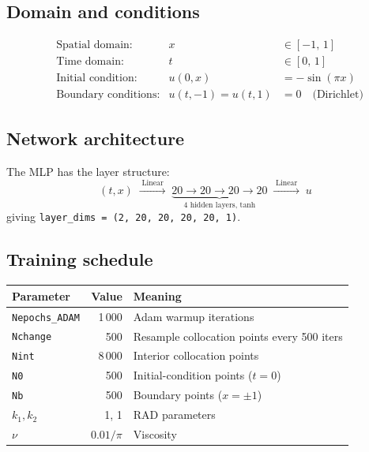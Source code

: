 \documentclass[11pt,a4paper]{article}
\begin{document}
\subsection*{Domain and conditions}

\begin{align}
  &\text{Spatial domain:}  &x &\in [-1,\, 1] \\
  &\text{Time domain:}     &t &\in [0,\, 1]   \\
  &\text{Initial condition:} &u(0, x) &= -\sin(\pi x) \label{eq:ic}\\
  &\text{Boundary conditions:} &u(t, -1) = u(t, 1) &= 0 \quad\text{(Dirichlet)} \label{eq:bc}
\end{align}

\subsection*{Network architecture}

The MLP has the layer structure:
\[
  (t,x) \;\xrightarrow{\;\text{Linear}\;}\;
  \underbrace{20 \to 20 \to 20 \to 20}_{\text{4 hidden layers, tanh}}
  \;\xrightarrow{\;\text{Linear}\;}\; u
\]
giving \texttt{layer\_dims = (2, 20, 20, 20, 20, 1)}.

\subsection*{Training schedule}

\begin{center}
\begin{tabular}{lrl}
\toprule
\textbf{Parameter} & \textbf{Value} & \textbf{Meaning} \\
\midrule
\texttt{Nepochs\_ADAM} & 1\,000   & Adam warmup iterations \\
\texttt{Nchange}       & 500      & Resample collocation points every 500 iters \\
\texttt{Nint}          & 8\,000   & Interior collocation points \\
\texttt{N0}            & 500      & Initial-condition points ($t{=}0$) \\
\texttt{Nb}            & 500      & Boundary points ($x{=}{\pm}1$) \\
\texttt{$k_1, k_2$}   & 1, 1     & RAD parameters \\
$\nu$                  & $0.01/\pi$ & Viscosity \\
\bottomrule
\end{tabular}
\end{center}
\end{document}
